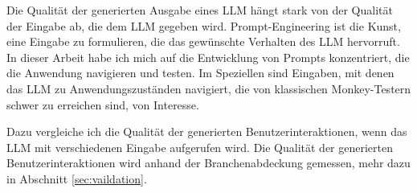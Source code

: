 Die Qualität der generierten Ausgabe eines LLM hängt stark von der Qualität der Eingabe ab, die dem LLM gegeben wird. \cite{chain-of-thought}
Prompt-Engineering ist die Kunst, eine Eingabe zu formulieren, die das gewünschte Verhalten des LLM hervorruft.
In dieser Arbeit habe ich mich auf die Entwicklung von Prompts konzentriert, die die Anwendung navigieren und testen.
Im Speziellen sind Eingaben, mit denen das LLM zu Anwendungszuständen navigiert, die von klassischen Monkey-Testern schwer zu erreichen sind, von Interesse.

Dazu vergleiche ich die Qualität der generierten Benutzerinteraktionen, wenn das LLM mit verschiedenen Eingabe aufgerufen wird.
Die Qualität der generierten Benutzerinteraktionen wird anhand der Branchenabdeckung gemessen, mehr dazu in Abschnitt \ref{sec:vaildation}.

